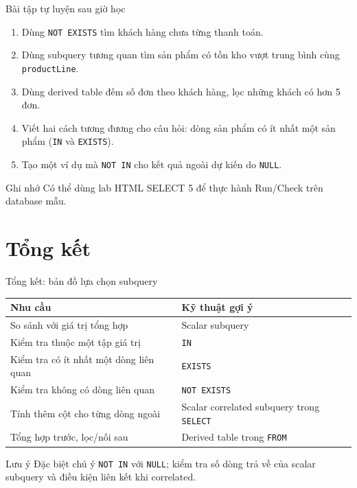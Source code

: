 \documentclass[aspectratio=169,10pt]{beamer}
\newcommand{\code}[1]{\texttt{#1}}
\begin{document}
\begin{frame}[fragile]{Bài tập tự luyện sau giờ học}
\small
\begin{enumerate}
\item Dùng \code{NOT EXISTS} tìm khách hàng chưa từng thanh toán.
\item Dùng subquery tương quan tìm sản phẩm có tồn kho vượt trung bình cùng \code{productLine}.
\item Dùng derived table đếm số đơn theo khách hàng, lọc những khách có hơn 5 đơn.
\item Viết hai cách tương đương cho câu hỏi: dòng sản phẩm có ít nhất một sản phẩm (\code{IN} và \code{EXISTS}).
\item Tạo một ví dụ mà \code{NOT IN} cho kết quả ngoài dự kiến do \code{NULL}.
\end{enumerate}
\vspace{.3em}
\begin{block}{Ghi nhớ}
\small Có thể dùng lab HTML SELECT 5 để thực hành Run/Check trên database mẫu.
\end{block}
\end{frame}

\section{Tổng kết}

\begin{frame}[fragile]{Tổng kết: bản đồ lựa chọn subquery}
\small
\begin{tabularx}{\linewidth}{l X}\toprule
Nhu cầu & Kỹ thuật gợi ý\\\midrule
So sánh với giá trị tổng hợp & Scalar subquery\\
Kiểm tra thuộc một tập giá trị & \code{IN}\\
Kiểm tra có ít nhất một dòng liên quan & \code{EXISTS}\\
Kiểm tra không có dòng liên quan & \code{NOT EXISTS}\\
Tính thêm cột cho từng dòng ngoài & Scalar correlated subquery trong \code{SELECT}\\
Tổng hợp trước, lọc/nối sau & Derived table trong \code{FROM}\\\bottomrule
\end{tabularx}
\vspace{.6em}
\begin{alertblock}{Lưu ý}
\small Đặc biệt chú ý \code{NOT IN} với \code{NULL}; kiểm tra số dòng trả về của scalar subquery và điều kiện liên kết khi correlated.
\end{alertblock}
\end{frame}
\end{document}
